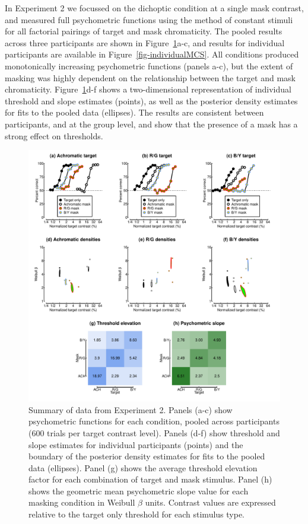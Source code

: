 \documentclass[
  letterpaper,
  DIV=11,
  numbers=noendperiod]{scrartcl}
\begin{document}
In Experiment 2 we focussed on the dichoptic condition at a single mask
contrast, and measured full psychometric functions using the method of
constant stimuli for all factorial pairings of target and mask
chromaticity. The pooled results across three participants are shown in
Figure~\ref{fig-MCSfig}a-c, and results for individual participants are
available in Figure~\ref{fig-individualMCS}. All conditions produced
monotonically increasing psychometric functions (panels a-c), but the
extent of masking was highly dependent on the relationship between the
target and mask chromaticity. Figure~\ref{fig-MCSfig}d-f shows a
two-dimensional representation of individual threshold and slope
estimates (points), as well as the posterior density estimates for fits
to the pooled data (ellipses). The results are consistent between
participants, and at the group level, and show that the presence of a
mask has a strong effect on thresholds.

\begin{figure}

{\centering \includegraphics{Figures/MCSdata.pdf}

}

\caption{\label{fig-MCSfig}Summary of data from Experiment 2. Panels
(a-c) show psychometric functions for each condition, pooled across
participants (600 trials per target contrast level). Panels (d-f) show
threshold and slope estimates for individual participants (points) and
the boundary of the posterior density estimates for fits to the pooled
data (ellipses). Panel (g) shows the average threshold elevation factor
for each combination of target and mask stimulus. Panel (h) shows the
geometric mean psychometric slope value for each masking condition in
Weibull \(\beta\) units. Contrast values are expressed relative to the
target only threshold for each stimulus type.}

\end{figure}
\end{document}

